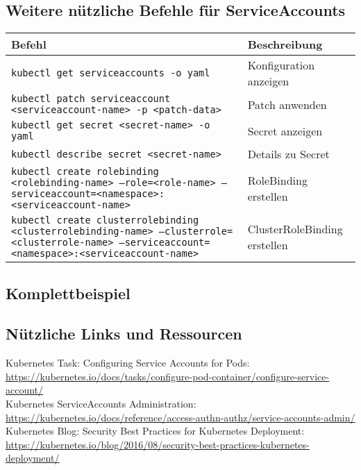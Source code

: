 \subsection{Weitere nützliche Befehle für ServiceAccounts}
\begin{tabular}{|p{}|p{}|}
\hline
\textbf{Befehl} & \textbf{Beschreibung} \\
\hline
\texttt{kubectl get serviceaccounts -o yaml} & Konfiguration anzeigen \\
\texttt{kubectl patch serviceaccount <serviceaccount-name> -p <patch-data>} & Patch anwenden \\
\texttt{kubectl get secret <secret-name> -o yaml} & Secret anzeigen \\
\texttt{kubectl describe secret <secret-name>} & Details zu Secret\\
\texttt{kubectl create rolebinding <rolebinding-name> --role=<role-name> --serviceaccount=<namespace>:<serviceaccount-name>} & RoleBinding erstellen \\
\texttt{kubectl create clusterrolebinding <clusterrolebinding-name> --clusterrole=<clusterrole-name> --serviceaccount=<namespace>:<serviceaccount-name>} & ClusterRoleBinding erstellen \\
\hline
\end{tabular}
\newpage
\subsection{Komplettbeispiel}

\subsection*{Nützliche Links und Ressourcen}
Kubernetes Task: Configuring Service Accounts for Pods:\\
\url{https://kubernetes.io/docs/tasks/configure-pod-container/configure-service-account/}\\
Kubernetes ServiceAccounts Administration:\\
\url{https://kubernetes.io/docs/reference/access-authn-authz/service-accounts-admin/}\\
Kubernetes Blog: Security Best Practices for Kubernetes Deployment:\\
\url{https://kubernetes.io/blog/2016/08/security-best-practices-kubernetes-deployment/}\\



\newpage

